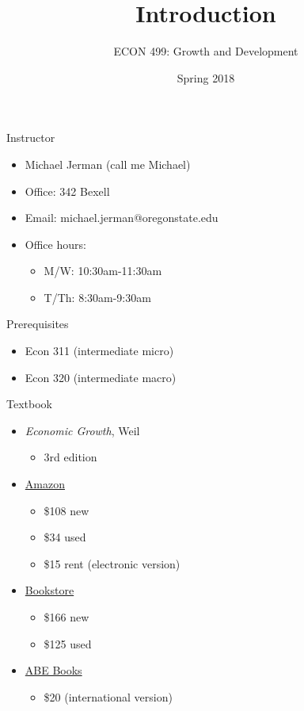 \documentclass[10pt]{beamer}
\author{ECON 499: Growth and Development}
\date{Spring 2018}
\title{Introduction}
\begin{document}
\maketitle

\begin{frame}[label={sec:org10367d4}]{}
\alert{Instructor}
\begin{itemize}
\item Michael Jerman (call me Michael)
\item Office: 342 Bexell
\item Email: michael.jerman@oregonstate.edu
\item Office hours:
\begin{itemize}
\item M/W: 10:30am-11:30am
\item T/Th: 8:30am-9:30am
\end{itemize}
\end{itemize}
\end{frame}

\begin{frame}[label={sec:orga496316}]{}
\alert{Prerequisites}
\begin{itemize}
\item Econ 311 (intermediate micro)
\item Econ 320 (intermediate macro)
\end{itemize}
\end{frame}

\begin{frame}[label={sec:org5b6b125}]{}
\alert{Textbook}
\begin{itemize}
\item \emph{Economic Growth}, Weil
\begin{itemize}
\item 3rd edition
\end{itemize}
\item \href{https://www.amazon.com/Economic-Growth-3rd-David-Weil/dp/0321795733/}{Amazon}
\begin{itemize}
\item \$108 new
\item \$34 used
\item \$15 rent (electronic version)
\end{itemize}
\item \href{http://verbacompare.osubeaverstore.com/comparison?id=2018-Spring\_\_ECON\_\_499\_\_002}{Bookstore}
\begin{itemize}
\item \$166 new
\item \$125 used
\end{itemize}
\item \href{https://www.abebooks.com/servlet/SearchResults?isbn=0321795733\&sts=t}{ABE Books}
\begin{itemize}
\item \$20 (international version)
\end{itemize}
\end{itemize}
\end{frame}
\end{document}
